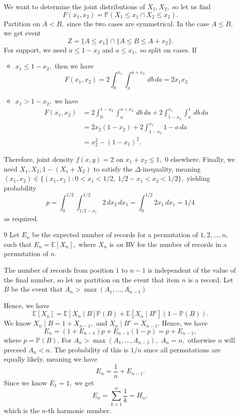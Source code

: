 \documentclass[12pt]{article}
\begin{document}
\begin{enumerate}
    We want to determine the joint distributions of $X_1, X_2, $ so let us find
    $$
    F(x_1, x_2) = \mathbb P(X_1 \leq x_1 \cap X_2 \leq x_2).
    $$
    Partition on $A < B,$ since the two cases are symmetrical. In the
    case $A \leq B,$ we get event $$
    Z =  \{A \leq x_1 \}\cap  \{A \leq B \leq A + x_2 \}.
    $$
    For support, we need $a \leq 1 - x_2$ and $a \leq x_1, $ so split
    on cases. If
    \begin{itemize}
      \item $x_1 \leq 1 - x_2,$ then we have $$
        F(x_1, x_2) = 2 \int_{0}^{x_1} \int_{a}^{a + x_2} \, db \, da = 2x_1 x_2
        $$
      \item $x_1 > 1 - x_2,$ we have
        \begin{align*}
          F(x_1, x_2) &= 2 \int_{0}^{1-x_2} \int_{a}^{a+x_2} \,d b \,
          da + 2 \int_{1-x_2}^{x_1} \int_{a}^{1} \, db \, da \\
          &= 2x_2(1-x_2) + 2 \int_{1-x_2}^{x_1} 1 - a \, da \\
          &= x_2^2 - (1-x_1)^2.
        \end{align*}
    \end{itemize}

    Therefore, joint density $f(x, y) = 2$ on $x_1 + x_2 \leq 1,$ 0
    elsewhere. Finally, we need $X_1, X_2, 1 - (X_1 + X_2)$ to
    satisfy the $\Delta$-inequality, meaning $(x_1, x_2) \in \{(x_1,
    x_2) : 0 < x_1 < 1/2, \ 1/2 - x_1 < x_2 < 1/2\},$ yielding probability
    $$
    p = \int_{0}^{1/2} \int_{1/2-x_1}^{1/2} 2 \, dx_2\, dx_1 =
    \int_{0}^{1/2} 2x_1 \, dx_1 = 1/4
    $$
    as required.

  \item[9] Let $E_n$ be the expected number of records for a
    permutation of $1, 2, \ldots, n,$ such that $E_n = \mathbb
    E[X_n],$ where $X_n$ is an RV for the number of records in a
    permutation of $n.$

    The number of records from position $1$ to $n - 1$ is independent
    of the value of the final number, so let us partition on the
    event that item $n$ is a record. Let $B$ be the event that $A_n >
    \max(A_1, \ldots, A_{n - 1})$

    Hence, we have
    $$
    \mathbb E[X_n] = \mathbb E[X_n \mid B] \mathbb P(B) + \mathbb
    E[X_n \mid  B^c] (1 - \mathbb P(B)).
    $$
    We know $X_n \mid B = 1 + X_{n - 1},$ and $X_n \mid B^c = X_{n -
    1}.$ Hence, we have
    $$
    E_n = (1 + E_{n-1}) p  + E_{n - 1}(1-p) = p + E_{n-1},
    $$
    where $p = \mathbb P(B).$ For $A_n > \max(A_1, \ldots, A_{n -
    1}),$ $A_n = n,$ otherwise $n$ will preceed $A_n < n.$ The
    probability of this is $1/n$ since all permutations are equally
    likely, meaning we have
    $$
    E_n = \dfrac{1}{n} + E_{n-1}.
    $$
    Since we know $E_1 = 1,$ we get $$E_n = \sum_{k =
    1}^{n}\dfrac{1}{k} = H_n,$$
    which is the $n$-th harmonic number.
\end{enumerate}
\end{document}
